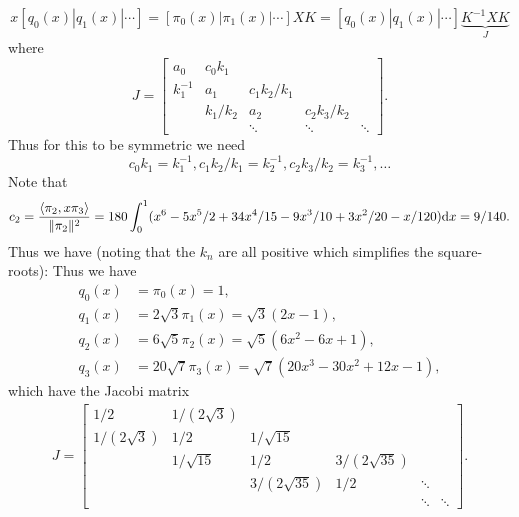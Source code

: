 \begin{example}
\[
x [q_0(x) | q_1(x) | \ensuremath{\cdots}] = [\ensuremath{\pi}_0(x)| \ensuremath{\pi}_1(x)| \ensuremath{\cdots}] X K = [q_0(x) | q_1(x) | \ensuremath{\cdots}] \underbrace{K^{-1} X K}_{J}
\]
where
\[
J = \begin{bmatrix} a_0 & c_0 k_1 \\
                         k_1^{-1} & a_1 & c_1 k_2/k_1 \\
                         & k_1/k_2 & a_2 & c_2 k_3/k_2 \\
                         &&\ensuremath{\ddots} & \ensuremath{\ddots} & \ensuremath{\ddots} \end{bmatrix}.
\]
Thus for this to be symmetric we need
\[
c_0 k_1 = k_1^{-1}, c_1 k_2/k_1 = k_2^{-1}, c_2 k_3/k_2 = k_3^{-1}, \ensuremath{\ldots}
\]
Note that
\[
c_2 = {\ensuremath{\langle}\ensuremath{\pi}_2,x \ensuremath{\pi}_3\ensuremath{\rangle}  \over \|\ensuremath{\pi}_2\|^2} = 180 \ensuremath{\int}_0^1 (x^6 -5x^5/2 + 34x^4/15 - 9x^3/10 + 3x^2/20 - x/120){\rm d} x = 9/140.
\]
Thus we have (noting that the $k_n$ are all positive which simplifies the square-roots):
Thus we have
\begin{align*}
q_0(x) &= \ensuremath{\pi}_0(x) = 1, \\
q_1(x) &= 2\sqrt{3} \ensuremath{\pi}_1(x)= \sqrt{3} (2  x - 1), \\
q_2(x) &= 6\sqrt{5} \ensuremath{\pi}_2(x) = \sqrt{5} (6x^2 - 6x + 1), \\
q_3(x) &= 20 \sqrt{7} \ensuremath{\pi}_3(x) = \sqrt{7} (20x^3-30x^2 + 12x - 1),
\end{align*}
which have the Jacobi matrix
\begin{align*}
J =
     \begin{bmatrix} 1/2 & 1/(2\sqrt{3}) \\
                    1/(2\sqrt{3}) & 1/2 &  1/\sqrt{15} \\
                    & 1/\sqrt{15} & 1/2 & 3/(2 \sqrt{35}) \\
                    && 3/(2 \sqrt{35}) &  1/2 & \ensuremath{\ddots} \\
                    &&& & \ensuremath{\ddots} & \ensuremath{\ddots} \end{bmatrix}.
\end{align*}
\end{example}


